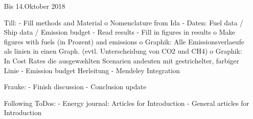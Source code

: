 Bis 14.Oktober 2018

Till:
- Fill methods and Material
    o   Nomenclature from Ida
- Daten: Fuel data / Ship data / Emission budget
- Read results
- Fill in figures in results
    o   Make figures with fuels (in Prozent) and emissions
    o   Graphik: Alle Emissionsverlaeufe als linien in einen Graph. (evtl. Unterscheidung von CO2 und CH4)
    o   Graphik: In Cost Rates die ausgewæhlten Scenarien andeuten mit gestrichelter, farbiger Linie
- Emission budget Herleitung
- Mendeley Integration

Frauke:
-	Finish discussion
-	Conclusion update

Following ToDos:
-	Energy journal: Articles for Introduction
-	General articles for Introduction
